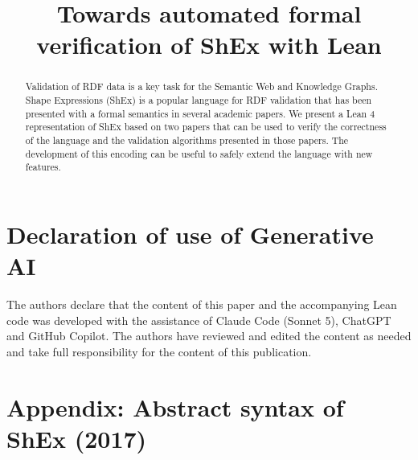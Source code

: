 \documentclass[runningheads]{llncs}
\begin{document}
%
\title{Towards automated formal verification of ShEx with Lean}
%
%
%
%
%
\maketitle              %
%
\begin{abstract}
Validation of RDF data is a key task for the Semantic Web and Knowledge Graphs.
Shape Expressions (ShEx) is a popular language for RDF validation 
 that has been presented with a formal semantics in several academic papers.
We present a Lean 4 representation of ShEx based on two papers
that can be used to verify the correctness of the language and the validation algorithms
presented in those papers. 
The development of this encoding can be useful to safely 
extend the language with new features.

\end{abstract}
%
%
%










\section*{Declaration of use of Generative AI}

The authors declare that the content of this paper and the accompanying Lean code 
 was developed with the assistance of Claude Code (Sonnet 5), ChatGPT and GitHub Copilot. 
The authors have reviewed and edited the content as needed and take 
 full responsibility for the content of this publication.
 



\section{Appendix: Abstract syntax of ShEx (2017)} \label{sec:appendixAbstractSyntaxShEx2017}
\end{document}

